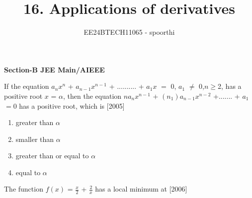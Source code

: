 \documentclass[journal,12pt,twocolumn]{IEEEtran}
\theoremstyle{remark}
\begin{document}



\title{16. Applications of derivatives}
\author{EE24BTECH11065 - spoorthi }
\maketitle
\newpage
\bigskip

\renewcommand{\thefigure}{\theenumi}
\renewcommand{\thetable}{\theenumi}
\begin{large}
\textbf{{Section-B JEE Main/AIEEE}}
\end{large}


    
    \item If the equation $a_nx^n$ + $a$$_{n-1}x^{n-1}$ + .......... + $a_1$$x$ $=$ 0, $a_1$ $\ne$ 0,$n$$\geq$2, has a positive root $x$ = $\alpha$, then the equation $n$$a_n$$x^{n-1}$  $+$ $(n_1)$$a_{n-1}$$x^{n-2}$ +....... + $a_1$ $=$0 has a positive root, which is 
    \hfill[2005]
    \begin{enumerate}
    
        
    
    
        \item greater than $\alpha$
        \item smaller than $\alpha$
        \item greater than or equal to $\alpha$
        \item equal to $\alpha$
        
        \end{enumerate}
        \item The function $f(x)$ = $\frac{x}{2}$ + $\frac{2}{x}$ has a local minimum at \hfill[2006]
\end{document}
